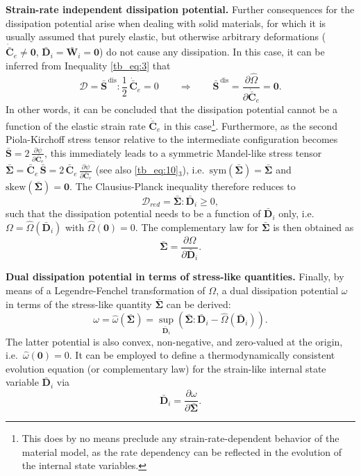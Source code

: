 \textbf{Strain-rate independent dissipation potential.} Further consequences for the dissipation potential arise when dealing with solid materials, for which it is usually assumed that purely elastic, but otherwise arbitrary deformations ($\dot{\bar{\bm{C}}}_e \ne \bm{0}$, $\bar{\bm{D}}_i = \bar{\bm{W}}_i = \bm{0}$) do not cause any dissipation. In this case, it can be inferred from Inequality \eqref{tb_eq:3} that
\begin{equation}
\label{tb_eq:5}
\mathcal{D} = \bar{\bm{S}}^{\,\mathrm{dis}}:\frac{1}{2}\,\dot{\bar{\bm{C}}}_e = 0 \qquad \Rightarrow \qquad \bar{\bm{S}}^{\,\mathrm{dis}} = \frac{\partial \hat{\Omega}}{\partial \dot{\bar{\bm{C}}}_e} = \bm{0}.
\end{equation}
In other words, it can be concluded that the dissipation potential cannot be a function of the elastic strain rate $\dot{\bar{\bm{C}}}_e$ in this case\footnote{This does by no means preclude any strain-rate-dependent behavior of the material model, as the rate dependency can be reflected in the evolution of the internal state variables.}. Furthermore, as the second Piola-Kirchoff stress tensor relative to the intermediate configuration becomes $\bar{\bm{S}} = 2\,\frac{\partial \psi}{\partial \bar{\bm{C}}_e}$, this immediately leads to a symmetric Mandel-like stress tensor $\bar{\bm{\Sigma}} = \bar{\bm{C}}_e\,\bar{\bm{S}} =  2\,\bar{\bm{C}}_e\,\frac{\partial\psi}{\partial\bar{\bm{C}}_e}$ (see also \eqref{tb_eq:10}$_3$), i.e.\ $ \mathrm{sym}(\bar{\bm{\Sigma}}) = \bar{\bm{\Sigma}}$ and $\mathrm{skew}(\bar{\bm{\Sigma}}) = \bm{0}$. The Clausius-Planck inequality therefore reduces to 
\begin{equation}
\label{tb_eq:6}
\mathcal{D}_{red} = \bar{\bm{\Sigma}}:\bar{\bm{D}}_i\geq 0,
\end{equation}
such that the dissipation potential needs to be a function of $\bar{\bm{D}}_i$ only, i.e.\ $\Omega = \hat{\Omega}(\bar{\bm{D}}_i)$ with $\hat{\Omega}(\bm{0}) = 0$. The complementary law for $\bar{\bm{\Sigma}}$ is then obtained as
\begin{equation}
\label{tb_eq:11}
\bar{\bm{\Sigma}} = \frac{\partial \Omega}{\partial \bar{\bm{D}}_i}.
\end{equation}

\textbf{Dual dissipation potential in terms of stress-like quantities.}
Finally, by means of a Legendre-Fenchel transformation of $\Omega$, a dual dissipation potential $\omega$ in terms of the stress-like quantity $\bar{\bm{\Sigma}}$ can be derived:
\begin{equation}
\label{tb_eq:8}
    \omega = \hat{\omega}(\bar{\bm{\Sigma}}) = \sup_{\bar{\bm{D}}_i}\left(\bar{\bm{\Sigma}} : \bar{\bm{D}}_i - \hat{\Omega}\!\left(\bar{\bm{D}}_i\right)\right).
\end{equation}
The latter potential is also convex, non-negative, and zero-valued at the origin, i.e.\ $\hat{\omega}(\bm{0}) = 0$. It can be employed to define a thermodynamically consistent evolution equation (or complementary law) for the strain-like internal state variable $\bar{\bm{D}}_i$ via
\begin{equation}
\label{tb_eq:11}
    \bar{\bm{D}}_i = \frac{\partial \omega}{\partial \bar{\bm{\Sigma}}}.
\end{equation}

